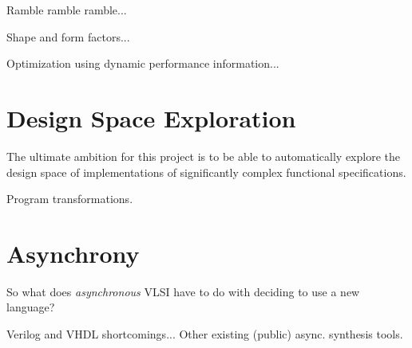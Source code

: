 Ramble ramble ramble...

Shape and form factors...

Optimization using dynamic performance information...

\section{Design Space Exploration}
\label{sec:goals:explore}

The ultimate ambition for this project is to be able to 
automatically explore the design space of implementations of
significantly complex functional specifications.  

Program transformations.  


\section{Asynchrony}
\label{sec:goals:async}

So what does \emph{asynchronous} VLSI have to do with deciding
to use a new language?  

Verilog and VHDL shortcomings...
Other existing (public) async. synthesis tools.  


